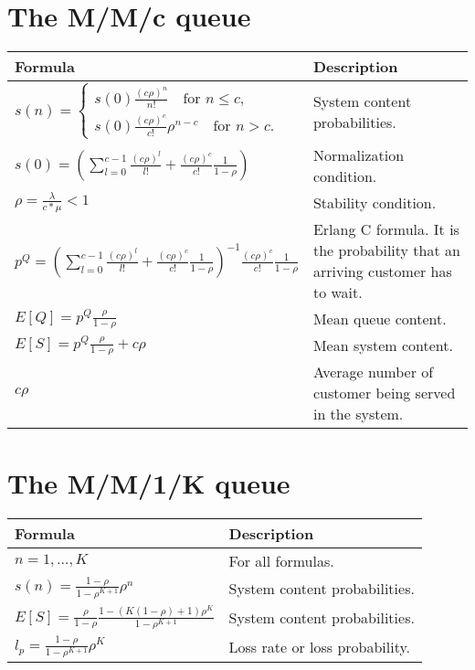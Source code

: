 \documentclass{article}
\begin{document}
\section{The M/M/c queue}
\renewcommand{\arraystretch}{3} %
\begin{longtable}{| p{9cm} | p{6cm} |}
    \hline
    \textbf{Formula} & \textbf{Description}  \\ \hline
    \endhead
    \hline
    \endfoot
    $ s(n) = {\begin{cases}{s(0)\frac {(c \rho)^n}{n!}}\quad {\text{for }} n\le c ,\\[8pt] s(0) \frac{(c\rho)^c}{c!}\rho^{n-c} \quad{\text{for }} n>c.\end{cases}} $ & System content probabilities. \\
    \hline
    $ s(0) = (\sum_{l=0}^{c-1}\frac{(c\rho)^l}{l!} + \frac{(c\rho)^c}{c!}\frac{1}{1- \rho}) $ & Normalization condition.\\
    \hline
    $ \rho = \frac{\lambda}{c*\mu} < 1 $ & Stability condition. \\
    \hline
    $ p^Q  = (\sum_{l=0}^{c-1}\frac{(c\rho)^l}{l!} + \frac{(c\rho)^c}{c!}\frac{1}{1- \rho})^{-1} \frac{(c\rho)^c}{c!}\frac{1}{1 - \rho} $ & Erlang C formula. It is the probability that an arriving customer has to wait. \\
    \hline
    $ E[Q] = p^Q \frac{\rho}{1 - \rho} $ & Mean queue content. \\
    \hline
    $ E[S] = p^Q \frac{\rho}{1 - \rho} + c\rho $ & Mean system content. \\
    \hline
    $ c\rho $ & Average number of customer being served in the system. \\
    \hline
\end{longtable}

\section{The M/M/1/K queue}

\begin{longtable}{| p{9cm} | p{6cm} |}
    \hline
    \textbf{Formula} & \textbf{Description}  \\ \hline
    \endhead
    \hline
    \endfoot
    $ n = 1, \ldots, K $ & For all formulas. \\
    \hline
    $ s(n) = \frac{1 - \rho}{1 - \rho^{K+1}} \rho^n $ & System content probabilities. \\
    \hline
    $ E[S] = \frac{\rho}{1 - \rho} \frac{1 - (K(1-\rho) + 1)\rho^K}{1 - \rho^{K+1}} $ & System content probabilities. \\
    \hline
    $ l_p = \frac{1 - \rho}{1 - \rho^{K+1}} \rho^K $ & Loss rate or loss probability. \\
    \hline
\end{longtable}
\end{document}
